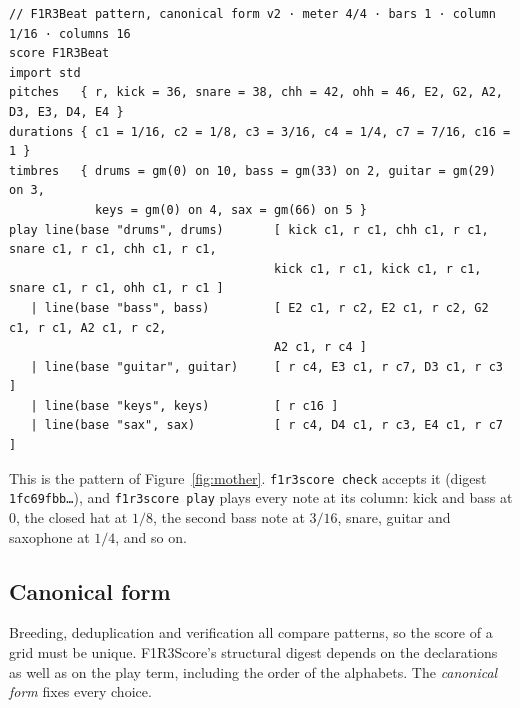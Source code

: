 \documentclass[11pt,a4paper]{article}
\newcommand{\code}[1]{\texttt{#1}}
\begin{document}
\begin{lstlisting}[language=score,basicstyle=\ttfamily\scriptsize]
// F1R3Beat pattern, canonical form v2 · meter 4/4 · bars 1 · column 1/16 · columns 16
score F1R3Beat
import std
pitches   { r, kick = 36, snare = 38, chh = 42, ohh = 46, E2, G2, A2, D3, E3, D4, E4 }
durations { c1 = 1/16, c2 = 1/8, c3 = 3/16, c4 = 1/4, c7 = 7/16, c16 = 1 }
timbres   { drums = gm(0) on 10, bass = gm(33) on 2, guitar = gm(29) on 3,
            keys = gm(0) on 4, sax = gm(66) on 5 }
play line(base "drums", drums)       [ kick c1, r c1, chh c1, r c1, snare c1, r c1, chh c1, r c1,
                                     kick c1, r c1, kick c1, r c1, snare c1, r c1, ohh c1, r c1 ]
   | line(base "bass", bass)         [ E2 c1, r c2, E2 c1, r c2, G2 c1, r c1, A2 c1, r c2,
                                     A2 c1, r c4 ]
   | line(base "guitar", guitar)     [ r c4, E3 c1, r c7, D3 c1, r c3 ]
   | line(base "keys", keys)         [ r c16 ]
   | line(base "sax", sax)           [ r c4, D4 c1, r c3, E4 c1, r c7 ]
\end{lstlisting}

This is the pattern of Figure~\ref{fig:mother}. \code{f1r3score check} accepts it (digest
\code{1fc69fbb\ldots}), and \code{f1r3score play} plays every note at its column: kick and bass
at 0, the closed hat at $1/8$, the second bass note at $3/16$, snare, guitar and saxophone at
$1/4$, and so on.

\subsection{Canonical form}\label{sec:canonical}

Breeding, deduplication and verification all compare patterns, so the score of a grid must be
unique. F1R3Score's structural digest depends on the declarations as well as on the play term,
including the order of the alphabets. The \emph{canonical form} fixes every choice.
\end{document}
